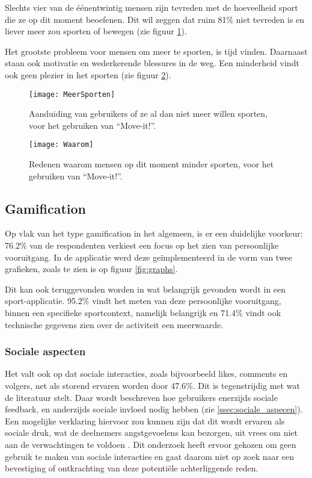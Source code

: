 Slechts vier van de éénentwintig mensen zijn tevreden met de hoeveelheid sport die ze op dit moment beoefenen. Dit wil zeggen dat ruim 81\% niet tevreden is en liever meer zou sporten of bewegen (zie figuur \ref{fig:meerBewegen}).

Het grootste probleem voor mensen om meer te sporten, is tijd vinden. Daarnaast staan ook motivatie en wederkerende blessures in de weg. Een minderheid vindt ook geen plezier in het sporten (zie figuur \ref{fig:waarom}).

\begin{figure}[h]
    \caption[Aanduiding van gebruikers of ze al dan niet meer willen sporten, voor het gebruiken van ``Move-it!'']{Aanduiding van gebruikers of ze al dan niet meer willen sporten, voor het gebruiken van ``Move-it!''.}
    \texttt{[image: MeerSporten]}
    \label{fig:meerBewegen}
\end{figure}

\begin{figure}[h]
    \caption[Redenen waarom mensen op dit moment minder sporten, voor het gebruiken van ``Move-it!'']{Redenen waarom mensen op dit moment minder sporten, voor het gebruiken van ``Move-it!''.}
    \texttt{[image: Waarom]}
    \label{fig:waarom}
\end{figure}

\subsection{Gamification}

Op vlak van het type gamification in het algemeen, is er een duidelijke voorkeur: 76.2\% van de respondenten verkiest een focus op het zien van persoonlijke vooruitgang. In de applicatie werd deze geïmplementeerd in de vorm van twee grafieken, zoals te zien is op figuur \ref{fig:graphs}.

Dit kan ook teruggevonden worden in wat belangrijk gevonden wordt in een sport-\linebreak applicatie. 95.2\% vindt het meten van deze persoonlijke vooruitgang, binnen een specifieke sportcontext, namelijk belangrijk en 71.4\% vindt ook technische gegevens zien over de activiteit een meerwaarde.

\subsubsection{Sociale aspecten}

Het valt ook op dat sociale interacties, zoals bijvoorbeeld likes, comments en volgers, net als storend ervaren worden door 47.6\%. Dit is tegenstrijdig met wat de literatuur stelt. Daar wordt beschreven hoe gebruikers enerzijds sociale feedback, en anderzijds sociale invloed nodig hebben (zie \ref{ssec:sociale_aspecen}). Een mogelijke verklaring hiervoor zou kunnen zijn dat dit wordt ervaren als sociale druk, wat de deelnemers angstgevoelens kan bezorgen, uit vrees om niet aan de verwachtingen te voldoen \autocite{Jong2010}. Dit onderzoek heeft ervoor gekozen om geen gebruik te maken van sociale interacties en gaat daarom niet op zoek naar een bevestiging of ontkrachting van deze potentiële achterliggende reden.

